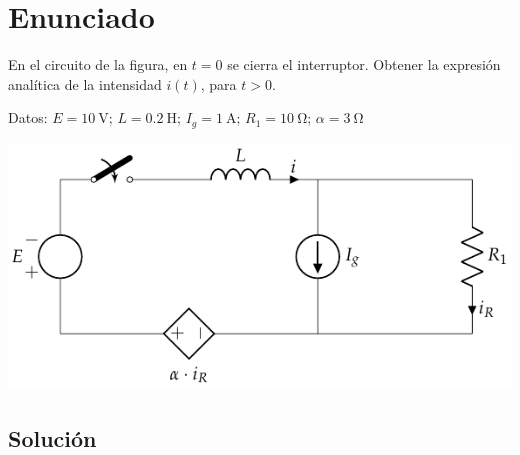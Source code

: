 \section{Enunciado}
En el circuito de la figura, en $t = 0$ se cierra el
  interruptor. Obtener la expresión analítica de la intensidad $i(t)$,
  para $t > 0$.

  Datos:\; $E = \qty{10}{\volt}$;\; $L = \qty{0.2}{\henry}$;\;
  $I_g = \qty{1}{\ampere}$;\; $R_1 = \qty{10}{\ohm}$;\;
  $\alpha = \qty{3}{\ohm}$

\begin{center}
  \includegraphics{figuras/BT4_06.pdf}
\end{center}

\subsection*{Solución}

